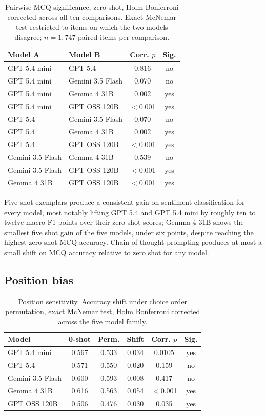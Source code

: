 \documentclass[11pt,a4paper]{article}
\begin{document}
\begin{table}[t]
\centering
\small
\begin{tabular}{llcc}
\toprule
\textbf{Model A} & \textbf{Model B} & \textbf{Corr. $p$} & \textbf{Sig.} \\
\midrule
GPT 5.4 mini & GPT 5.4 & 0.816 & no \\
GPT 5.4 mini & Gemini 3.5 Flash & 0.070 & no \\
GPT 5.4 mini & Gemma 4 31B & 0.002 & yes \\
GPT 5.4 mini & GPT OSS 120B & $<$0.001 & yes \\
GPT 5.4 & Gemini 3.5 Flash & 0.070 & no \\
GPT 5.4 & Gemma 4 31B & 0.002 & yes \\
GPT 5.4 & GPT OSS 120B & $<$0.001 & yes \\
Gemini 3.5 Flash & Gemma 4 31B & 0.539 & no \\
Gemini 3.5 Flash & GPT OSS 120B & $<$0.001 & yes \\
Gemma 4 31B & GPT OSS 120B & $<$0.001 & yes \\
\bottomrule
\end{tabular}
\caption{Pairwise MCQ significance, zero shot, Holm Bonferroni corrected across all ten comparisons. Exact McNemar test restricted to items on which the two models disagree; $n{=}1{,}747$ paired items per comparison.}
\label{tab:pairwise}
\end{table}

Five shot exemplars produce a consistent gain on sentiment classification for every model, most notably lifting GPT 5.4 and GPT 5.4 mini by roughly ten to twelve macro F1 points over their zero shot scores; Gemma 4 31B shows the smallest five shot gain of the five models, under six points, despite reaching the highest zero shot MCQ accuracy. Chain of thought prompting produces at most a small shift on MCQ accuracy relative to zero shot for any model.

\subsection{Position bias}
\label{sec:position-bias}

\begin{table}[t]
\centering
\small
\begin{tabular}{lccccc}
\toprule
\textbf{Model} & \textbf{0-shot} & \textbf{Perm.} & \textbf{Shift} & \textbf{Corr. $p$} & \textbf{Sig.} \\
\midrule
GPT 5.4 mini & 0.567 & 0.533 & 0.034 & 0.0105 & yes \\
GPT 5.4 & 0.571 & 0.550 & 0.020 & 0.159 & no \\
Gemini 3.5 Flash & 0.600 & 0.593 & 0.008 & 0.417 & no \\
Gemma 4 31B & 0.616 & 0.563 & 0.054 & $<$0.001 & yes \\
GPT OSS 120B & 0.506 & 0.476 & 0.030 & 0.035 & yes \\
\bottomrule
\end{tabular}
\caption{Position sensitivity. Accuracy shift under choice order permutation, exact McNemar test, Holm Bonferroni corrected across the five model family.}
\label{tab:position-bias}
\end{table}
\end{document}
